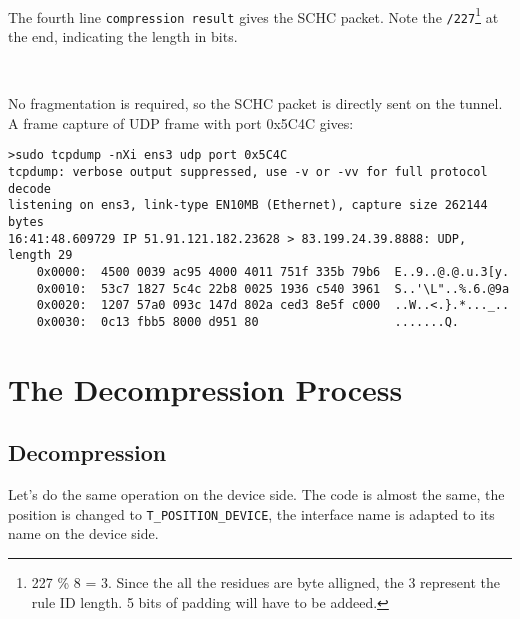 \documentclass[onecolumn,12pt]{book}
\newcounter{c}
\begin{document}
~~~

The fourth line \texttt{compression result} gives the SCHC packet. Note the \texttt{/227}\footnote {227 \% 8 = 3.  Since the all the residues are byte alligned, the 3 represent the rule ID length. 5 bits of padding will have to be addeed.} at the end, indicating the length in bits. 



~~

No fragmentation is required, so the SCHC packet is directly sent on the tunnel. A frame capture of UDP frame with port 0x5C4C gives:

\begin{lstlisting}[basicstyle=\ttfamily\scriptsize]
>sudo tcpdump -nXi ens3 udp port 0x5C4C
tcpdump: verbose output suppressed, use -v or -vv for full protocol decode
listening on ens3, link-type EN10MB (Ethernet), capture size 262144 bytes
16:41:48.609729 IP 51.91.121.182.23628 > 83.199.24.39.8888: UDP, length 29
	0x0000:  4500 0039 ac95 4000 4011 751f 335b 79b6  E..9..@.@.u.3[y.
	0x0010:  53c7 1827 5c4c 22b8 0025 1936 c540 3961  S..'\L"..%.6.@9a
	0x0020:  1207 57a0 093c 147d 802a ced3 8e5f c000  ..W..<.}.*..._..
	0x0030:  0c13 fbb5 8000 d951 80                   .......Q.

\end{lstlisting}
 
\section{The Decompression Process}

\subsection{Decompression}

Let's do the same operation on the device side. The code is almost the same, the position is changed to \texttt{T\_POSITION\_DEVICE}, the interface name is adapted to its name on the device side.
\end{document}
